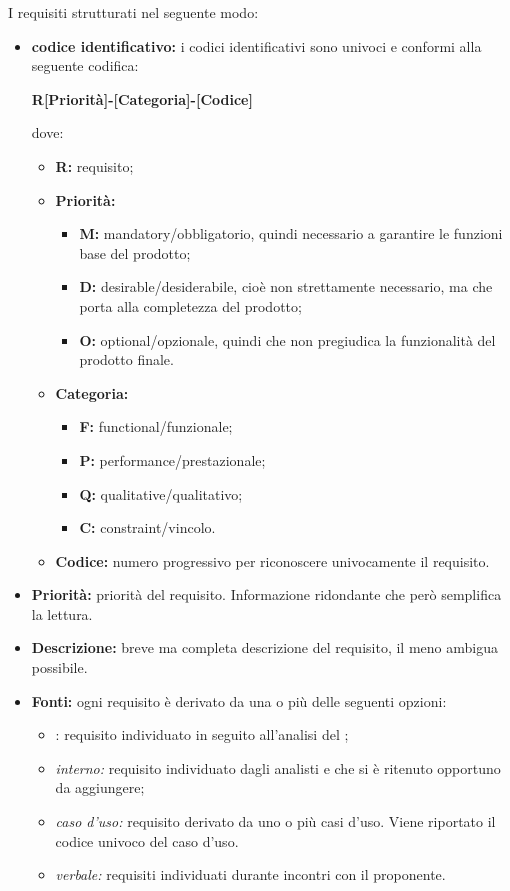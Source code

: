 
I requisiti strutturati nel seguente modo:

\begin{itemize}
	
	\item \textbf{codice identificativo:} i codici identificativi sono univoci e conformi alla seguente codifica:
	\begin{center}
		\textbf{R[Priorità]-[Categoria]-[Codice]}
	\end{center}
	dove: 
		\begin{itemize}
			\item \textbf{R:} requisito;
			\item \textbf{Priorità:}
			\begin{itemize}
				\item \textbf{M:} mandatory/obbligatorio, quindi necessario a garantire le funzioni base del prodotto;
				\item \textbf{D:} desirable/desiderabile, cioè non strettamente necessario, ma che porta alla completezza del prodotto;
				\item \textbf{O:} optional/opzionale, quindi che non pregiudica la funzionalità del prodotto finale.
			\end{itemize}
			\item \textbf{Categoria:}
			\begin{itemize}
				\item \textbf{F:} functional/funzionale;
				\item \textbf{P:} performance/prestazionale;
				\item \textbf{Q:} qualitative/qualitativo;
				\item \textbf{C:} constraint/vincolo.
			\end{itemize}
			\item \textbf{Codice:} numero progressivo per riconoscere univocamente il requisito.
		\end{itemize}
	
	\item \textbf{Priorità:} priorità del requisito. Informazione ridondante che però semplifica la lettura.
	
	\item \textbf{Descrizione:} breve ma completa descrizione del requisito, il meno ambigua possibile. 
	
	\item \textbf{Fonti:} ogni requisito è derivato da una o più delle seguenti opzioni:
		\begin{itemize}
			\item {}: requisito individuato in seguito all'analisi del ;
			\item \textit{interno:} requisito individuato dagli analisti e che si è ritenuto opportuno da aggiungere;
			\item \textit{caso d'uso:} requisito derivato da uno o più casi d'uso. Viene riportato il codice univoco del caso d'uso.
			\item \textit{verbale:} requisiti individuati durante incontri con il proponente.			
		\end{itemize}	
\end{itemize}

